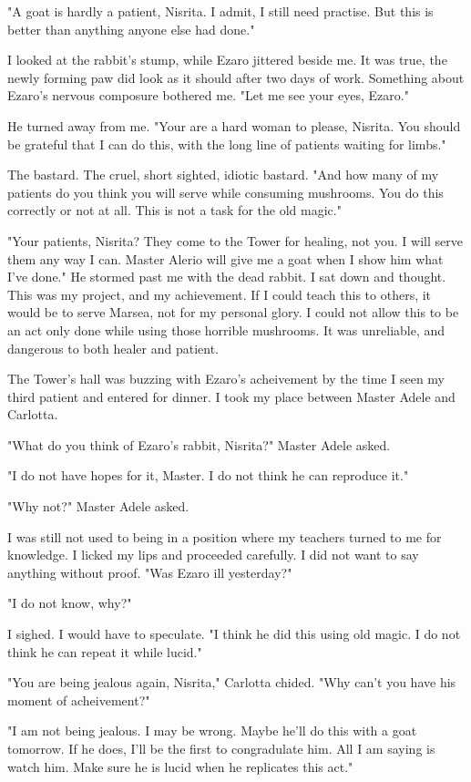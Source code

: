 \documentclass{article}
\begin{document}
"A goat is hardly a patient, Nisrita. I admit, I still need practise. But this is better than anything anyone else had done."

I looked at the rabbit's stump, while Ezaro jittered beside me. It was true, the newly forming paw did look as it should after two days of work. Something about Ezaro's nervous composure bothered me. "Let me see your eyes, Ezaro."

He turned away from me. "Your are a hard woman to please, Nisrita. You should be grateful that I can do this, with the long line of patients waiting for limbs."

The bastard. The cruel, short sighted, idiotic bastard. "And how many of my patients do you think you will serve while consuming mushrooms. You do this correctly or not at all. This is not a task for the old magic."

"Your patients, Nisrita? They come to the Tower for healing, not you. I will serve them any way I can. Master Alerio will give me a goat when I show him what I've done." He stormed past me with the dead rabbit. I sat down and thought. This was my project, and my achievement. If I could teach this to others, it would be to serve Marsea, not for my personal glory. I could not allow this to be an act only done while using those horrible mushrooms. It was unreliable, and dangerous to both healer and patient. 

The Tower's hall was buzzing with Ezaro's acheivement by the time I seen my third patient and entered for dinner. I took my place between Master Adele and Carlotta. 

"What do you think of Ezaro's rabbit, Nisrita?" Master Adele asked.

"I do not have hopes for it, Master. I do not think he can reproduce it."

"Why not?" Master Adele asked. 

I was still not used to being in a position where my teachers turned to me for knowledge. I licked my lips and proceeded carefully. I did not want to say anything without proof. "Was Ezaro ill yesterday?" 

"I do not know, why?" 

I sighed. I would have to speculate. "I think he did this using old magic. I do not think he can repeat it while lucid."

"You are being jealous again, Nisrita," Carlotta chided. "Why can't you have his moment of acheivement?"

"I am not being jealous. I may be wrong. Maybe he'll do this with a goat tomorrow. If he does, I'll be the first to congradulate him. All I am saying is watch him. Make sure he is lucid when he replicates this act."
\end{document}
